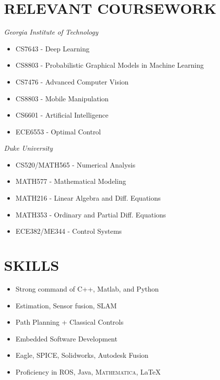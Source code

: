 \documentclass[paper=letter,fontsize=11pt]{scrartcl} %
\newcommand{\NewPart}[2]{\section*{\uppercase{#1} #2}}
\begin{document}
\NewPart{Relevant Coursework}{}
\textit{Georgia Institute of Technology}
	\begin{itemize}
		\item CS7643 - Deep Learning
		\item CS8803 - Probabilistic Graphical Models in Machine Learning
		\item CS7476 - Advanced Computer Vision
		\item CS8803 - Mobile Manipulation
		\item CS6601 - Artificial Intelligence
		\item ECE6553 - Optimal Control
	\end{itemize}
\textit{Duke University}
	\begin{itemize}
		\item CS520/MATH565 - Numerical Analysis
		\item MATH577 - Mathematical Modeling
		\item MATH216 - Linear Algebra and Diff. Equations
		\item MATH353 - Ordinary and Partial Diff. Equations
		\item ECE382/ME344 - Control Systems
	\end{itemize}

\NewPart{Skills}{}

\begin{itemize} %
	\item Strong command of C++, Matlab, and Python
	\item Estimation, Sensor fusion, SLAM
	\item Path Planning + Classical Controls
	\item Embedded Software Development
	\item Eagle, SPICE, Solidworks, Autodesk Fusion
	\item Proficiency in ROS, Java, \textsc{Mathematica}, \LaTeX
\end{itemize}
\end{document}
